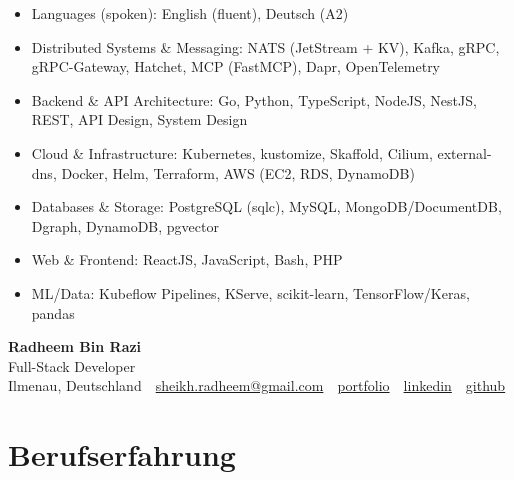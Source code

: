 \documentclass[10pt,a4paper]{resume}
\makeatletter
\newcommand{\Portfolio}{https://radheem.github.io/my-cv}
\newcommand{\PortfolioText}{portfolio}
\newcommand{\GitHub}{https://github.com/radheem}
\newcommand{\LinkedIn}{https://www.linkedin.com/in/radheem-razi}
\newcommand{\Email}{sheikh.radheem@gmail.com}
\makeatother
\begin{document}
\begin{itemize}[leftmargin=1.4em,nosep,topsep=2pt]
  \item Languages (spoken): English (fluent), Deutsch (A2)
  \item Distributed Systems \& Messaging: NATS (JetStream + KV), Kafka, gRPC, gRPC-Gateway, Hatchet, MCP (FastMCP), Dapr, OpenTelemetry
  \item Backend \& API Architecture: Go, Python, TypeScript, NodeJS, NestJS, REST, API Design, System Design
  \item Cloud \& Infrastructure: Kubernetes, kustomize, Skaffold, Cilium, external-dns, Docker, Helm, Terraform, AWS (EC2, RDS, DynamoDB)
  \item Databases \& Storage: PostgreSQL (sqlc), MySQL, MongoDB/DocumentDB, Dgraph, DynamoDB, pgvector
  \item Web \& Frontend: ReactJS, JavaScript, Bash, PHP
  \item ML/Data: Kubeflow Pipelines, KServe, scikit-learn, TensorFlow/Keras, pandas
\end{itemize}

\clearpage
{}

\begin{center}
  {\huge\bfseries Radheem Bin Razi}\\[3pt]
  {\large Full-Stack Developer}\\[6pt]
  \small
  Ilmenau, Deutschland \,\textbar\,
  \href{mailto:\Email}{\Email} \,\textbar\,
  \href{\Portfolio}{\PortfolioText} \,\textbar\,
  \href{\LinkedIn}{linkedin} \,\textbar\,
  \href{\GitHub}{github}
\end{center}
\vspace{2pt}

\section{Berufserfahrung}
\end{document}
